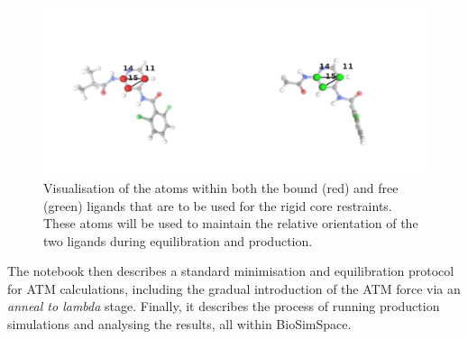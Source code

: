 \begin{figure}[htp]
\includegraphics[width=\linewidth]{LIVECOMS/04_fep/alignment_visualisation.png}
\caption{Visualisation of the atoms within both the bound (red) and free (green) ligands that are to be used for the rigid core restraints. These atoms will be used to maintain the relative orientation of the two ligands during equilibration and production.}
\label{fig:ATM_rigid_cores}
\end{figure}

The notebook then describes a standard minimisation and equilibration protocol for ATM calculations, including the gradual introduction of the ATM force via an \textit{anneal to lambda} stage. Finally, it describes the process of running production simulations and analysing the results, all within BioSimSpace.
